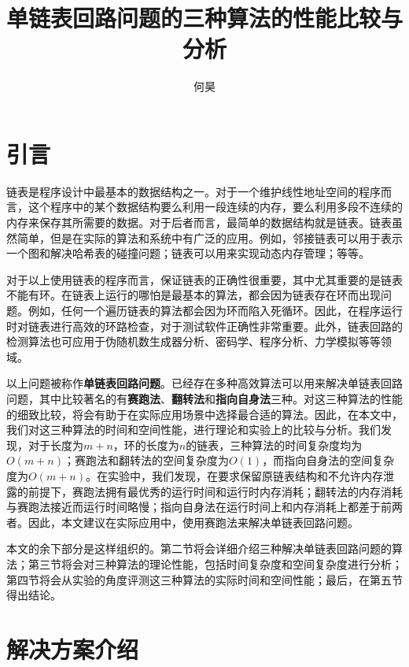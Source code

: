 \documentclass[UTF8]{ctexart}
\title{单链表回路问题的三种算法的性能比较与分析}
\author{何昊}
\begin{document}
\maketitle

\section{引言}

链表是程序设计中最基本的数据结构之一。对于一个维护线性地址空间的程序而言，这个程序中的某个数据结构要么利用一段连续的内存，要么利用多段不连续的内存来保存其所需要的数据。对于后者而言，最简单的数据结构就是链表。链表虽然简单，但是在实际的算法和系统中有广泛的应用。例如，邻接链表可以用于表示一个图和解决哈希表的碰撞问题\cite{cormen2009introduction}；链表可以用来实现动态内存管理\cite{bryant2003computer}；等等。

对于以上使用链表的程序而言，保证链表的正确性很重要，其中尤其重要的是链表不能有环。在链表上运行的哪怕是最基本的算法，都会因为链表存在环而出现问题。例如，任何一个遍历链表的算法都会因为环而陷入死循环。因此，在程序运行时对链表进行高效的环路检查，对于测试软件正确性非常重要\cite{auguston1997assertions}。此外，链表回路的检测算法也可应用于伪随机数生成器分析\cite{knuth2014art}、密码学\cite{quisquater1989easy}、程序分析\cite{van1987efficient}、力学模拟\cite{fich1981lower}等等领域。

以上问题被称作\textbf{单链表回路问题}。已经存在多种高效算法可以用来解决单链表回路问题，其中比较著名的有\textbf{赛跑法}、\textbf{翻转法}和\textbf{指向自身法}三种。对这三种算法的性能的细致比较，将会有助于在实际应用场景中选择最合适的算法。因此，在本文中，我们对这三种算法的时间和空间性能，进行理论和实验上的比较与分析。我们发现，对于长度为$m+n$，环的长度为$n$的链表，三种算法的时间复杂度均为$O(m+n)$；赛跑法和翻转法的空间复杂度为$O(1)$，而指向自身法的空间复杂度为$O(m+n)$。在实验中，我们发现，在要求保留原链表结构和不允许内存泄露的前提下，赛跑法拥有最优秀的运行时间和运行时内存消耗；翻转法的内存消耗与赛跑法接近而运行时间略慢；指向自身法在运行时间上和内存消耗上都差于前两者。因此，本文建议在实际应用中，使用赛跑法来解决单链表回路问题。

本文的余下部分是这样组织的。第二节将会详细介绍三种解决单链表回路问题的算法；第三节将会对三种算法的理论性能，包括时间复杂度和空间复杂度进行分析；第四节将会从实验的角度评测这三种算法的实际时间和空间性能；最后，在第五节得出结论。

\section{解决方案介绍}
\end{document}
